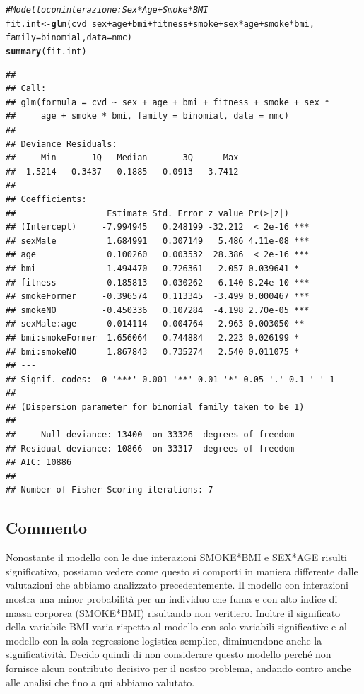 \documentclass{article}\usepackage[]{graphicx}\usepackage[]{xcolor}
\makeatletter
\newcommand{\hlcom}[1]{\textcolor[rgb]{0.678,0.584,0.686}{\textit{#1}}}%
\newcommand{\hlopt}[1]{\textcolor[rgb]{0,0,0}{#1}}%
\newcommand{\hlstd}[1]{\textcolor[rgb]{0.345,0.345,0.345}{#1}}%
\newcommand{\hlkwb}[1]{\textcolor[rgb]{0.69,0.353,0.396}{#1}}%
\newcommand{\hlkwc}[1]{\textcolor[rgb]{0.333,0.667,0.333}{#1}}%
\newcommand{\hlkwd}[1]{\textcolor[rgb]{0.737,0.353,0.396}{\textbf{#1}}}%
\newenvironment{kframe}{%
 \def\at@end@of@kframe{}%
 \ifinner\ifhmode%
  \def\at@end@of@kframe{\end{minipage}}%
  \begin{minipage}{\columnwidth}%
 \fi\fi%
 \def\FrameCommand##1{\hskip\@totalleftmargin \hskip-\fboxsep
 \colorbox{shadecolor}{##1}\hskip-\fboxsep
     \hskip-\linewidth \hskip-\@totalleftmargin \hskip\columnwidth}%
 \MakeFramed {\advance\hsize-\width
   \@totalleftmargin\z@ \linewidth\hsize
   \@setminipage}}%
 {\par\unskip\endMakeFramed%
 \at@end@of@kframe}
\newenvironment{knitrout}{}{} %
\makeatother
\begin{document}
\begin{knitrout}
\color{fgcolor}\begin{kframe}
\begin{alltt}
\hlcom{#Modello con interazione: Sex*Age + Smoke*BMI}
\hlstd{fit.int} \hlkwb{<-} \hlkwd{glm}\hlstd{(cvd}\hlopt{~}\hlstd{sex}\hlopt{+}\hlstd{age}\hlopt{+}\hlstd{bmi}\hlopt{+}\hlstd{fitness}\hlopt{+}\hlstd{smoke}\hlopt{+}\hlstd{sex}\hlopt{*}\hlstd{age}\hlopt{+}\hlstd{smoke}\hlopt{*}\hlstd{bmi,}
               \hlkwc{family}\hlstd{=binomial,} \hlkwc{data}\hlstd{=nmc)}
\hlkwd{summary}\hlstd{(fit.int)}
\end{alltt}
\begin{verbatim}
## 
## Call:
## glm(formula = cvd ~ sex + age + bmi + fitness + smoke + sex * 
##     age + smoke * bmi, family = binomial, data = nmc)
## 
## Deviance Residuals: 
##     Min       1Q   Median       3Q      Max  
## -1.5214  -0.3437  -0.1885  -0.0913   3.7412  
## 
## Coefficients:
##                  Estimate Std. Error z value Pr(>|z|)    
## (Intercept)     -7.994945   0.248199 -32.212  < 2e-16 ***
## sexMale          1.684991   0.307149   5.486 4.11e-08 ***
## age              0.100260   0.003532  28.386  < 2e-16 ***
## bmi             -1.494470   0.726361  -2.057 0.039641 *  
## fitness         -0.185813   0.030262  -6.140 8.24e-10 ***
## smokeFormer     -0.396574   0.113345  -3.499 0.000467 ***
## smokeNO         -0.450336   0.107284  -4.198 2.70e-05 ***
## sexMale:age     -0.014114   0.004764  -2.963 0.003050 ** 
## bmi:smokeFormer  1.656064   0.744884   2.223 0.026199 *  
## bmi:smokeNO      1.867843   0.735274   2.540 0.011075 *  
## ---
## Signif. codes:  0 '***' 0.001 '**' 0.01 '*' 0.05 '.' 0.1 ' ' 1
## 
## (Dispersion parameter for binomial family taken to be 1)
## 
##     Null deviance: 13400  on 33326  degrees of freedom
## Residual deviance: 10866  on 33317  degrees of freedom
## AIC: 10886
## 
## Number of Fisher Scoring iterations: 7
\end{verbatim}
\end{kframe}
\end{knitrout}

  \subsection{Commento}
    Nonostante il modello con le due interazioni SMOKE*BMI e SEX*AGE risulti
    significativo, possiamo vedere come questo si comporti in maniera differente
    dalle valutazioni che abbiamo analizzato precedentemente.
    Il modello con interazioni mostra una minor probabilità per un individuo che
    fuma e con alto indice di massa corporea (SMOKE*BMI) risultando non
    veritiero.
    Inoltre il significato della variabile BMI varia rispetto al modello con 
    solo variabili significative e al modello con la sola regressione logistica 
    semplice, diminuendone anche la significatività.
    Decido quindi di non considerare questo modello perché non fornisce alcun 
    contributo decisivo per il nostro problema, andando contro anche alle 
    analisi che fino a qui abbiamo valutato.
    
\end{document}
